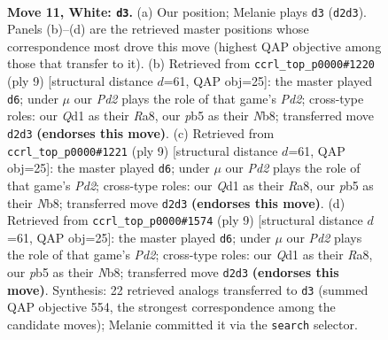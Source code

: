 \documentclass[11pt]{article}
\begin{document}
\clearpage

\begin{figure}[p]\centering
\begin{subfigure}{0.46\textwidth}\centering
\resizebox{\linewidth}{!}{%
\newchessgame
\chessboard[
  setfen={rnbqk2r/2p1bpp1/p2p4/1p1Pp2p/8/1B3N2/PPPP1PPP/R1BQR1K1 w kq - 1 11},
  showmover=false,
  pgfstyle=straightmove, color=movearrow, markmove={d2-d3}
]}
\caption{}
\end{subfigure}\hfill
\begin{subfigure}{0.46\textwidth}\centering
\resizebox{\linewidth}{!}{%
\newchessgame
\chessboard[
  setfen={rnbqkb1r/pp1p1ppp/5n2/2pP4/8/6P1/PP2PP1P/RNBQKBNR b KQkq - 0 5},
  showmover=false,
  pgfstyle=straightmove, color=movearrow, markmove={d7-d6}
]}
\caption{}
\end{subfigure}
\\[4pt]
\begin{subfigure}{0.46\textwidth}\centering
\resizebox{\linewidth}{!}{%
\newchessgame
\chessboard[
  setfen={rnbqkb1r/pp1p1ppp/5n2/2pP4/8/6P1/PP2PP1P/RNBQKBNR b KQkq - 0 5},
  showmover=false,
  pgfstyle=straightmove, color=movearrow, markmove={d7-d6}
]}
\caption{}
\end{subfigure}\hfill
\begin{subfigure}{0.46\textwidth}\centering
\resizebox{\linewidth}{!}{%
\newchessgame
\chessboard[
  setfen={rnbqkb1r/pp1p1ppp/5n2/2pP4/8/6P1/PP2PP1P/RNBQKBNR b KQkq - 0 5},
  showmover=false,
  pgfstyle=straightmove, color=movearrow, markmove={d7-d6}
]}
\caption{}
\end{subfigure}
\caption{\textbf{Move 11, White: \texttt{d3}.} (a) Our position; Melanie plays \texttt{d3} (\texttt{d2d3}). Panels (b)--(d) are the retrieved master positions whose correspondence most drove this move (highest QAP objective among those that transfer to it). (b) Retrieved from \texttt{ccrl\_top\_p0000\#1220} (ply 9) [structural distance $d$=61, QAP obj=25]: the master played \texttt{d6}; under $\mu$ our \emph{Pd2} plays the role of that game's \emph{Pd2}; cross-type roles: our \emph{Q}d1 as their \emph{R}a8, our \emph{p}b5 as their \emph{N}b8; transferred move \texttt{d2d3} \textbf{(endorses this move)}. (c) Retrieved from \texttt{ccrl\_top\_p0000\#1221} (ply 9) [structural distance $d$=61, QAP obj=25]: the master played \texttt{d6}; under $\mu$ our \emph{Pd2} plays the role of that game's \emph{Pd2}; cross-type roles: our \emph{Q}d1 as their \emph{R}a8, our \emph{p}b5 as their \emph{N}b8; transferred move \texttt{d2d3} \textbf{(endorses this move)}. (d) Retrieved from \texttt{ccrl\_top\_p0000\#1574} (ply 9) [structural distance $d$=61, QAP obj=25]: the master played \texttt{d6}; under $\mu$ our \emph{Pd2} plays the role of that game's \emph{Pd2}; cross-type roles: our \emph{Q}d1 as their \emph{R}a8, our \emph{p}b5 as their \emph{N}b8; transferred move \texttt{d2d3} \textbf{(endorses this move)}. Synthesis: 22 retrieved analogs transferred to \texttt{d3} (summed QAP objective 554, the strongest correspondence among the candidate moves); Melanie committed it via the \texttt{search} selector.}
\label{fig:thought-m20}
\end{figure}
\end{document}
